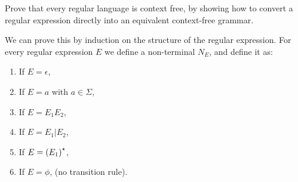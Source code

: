 \documentclass{article}
\begin{document}
\begin{exercise}
Prove that every regular language is context free, by showing how to convert a regular expression directly into an equivalent context-free grammar.
\begin{answer}
We can prove this by induction on the structure of the regular expression. For every regular expression $E$ we define a non-terminal $N_E$, and define it as:
\begin{enumerate}
 \item If $E=\epsilon$, 
 \item If $E=a$ with $a\in\Sigma$, 
 \item If $E=E_1E_2$, 
 \item If $E=E_1|E_2$, 
 \item If $E=\left( E_1 \right)^{\star}$, 
 \item If $E=\phi$,  (no transition rule).
\end{enumerate}
\end{answer}
\end{exercise}
\end{document}
